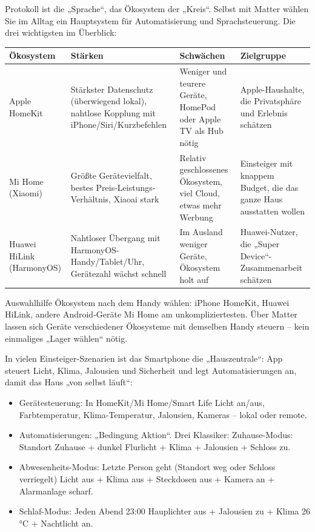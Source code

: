 
Protokoll ist die „Sprache“, das Ökosystem der „Kreis“. Selbst mit Matter wählen Sie im Alltag ein Hauptsystem für Automatisierung und Sprachsteuerung. Die drei wichtigsten im Überblick:

\begin{center}
\begin{tabularx}{\linewidth}{|X|X|X|X|}
\hline
\textbf{Ökosystem} & \textbf{Stärken} & \textbf{Schwächen} & \textbf{Zielgruppe} \tabularnewline
\hline
Apple HomeKit & Stärkster Datenschutz (überwiegend lokal), nahtlose Kopplung mit iPhone/Siri/Kurzbefehlen & Weniger und teurere Geräte, HomePod oder Apple TV als Hub nötig & Apple-Haushalte, die Privatsphäre und Erlebnis schätzen \tabularnewline
Mi Home (Xiaomi) & Größte Gerätevielfalt, bestes Preis-Leistungs-Verhältnis, Xiaoai stark & Relativ geschlossenes Ökosystem, viel Cloud, etwas mehr Werbung & Einsteiger mit knappem Budget, die das ganze Haus ausstatten wollen \tabularnewline
Huawei HiLink (HarmonyOS) & Nahtloser Übergang mit HarmonyOS-Handy/Tablet/Uhr, Gerätezahl wächst schnell & Im Ausland weniger Geräte, Ökosystem holt auf & Huawei-Nutzer, die „Super Device“-Zusammenarbeit schätzen \tabularnewline
\hline
\end{tabularx}
\end{center}

\begin{tcbinfo}{Auswahlhilfe}
Ökosystem nach dem Handy wählen: iPhone HomeKit, Huawei HiLink, andere Android-Geräte Mi Home am unkompliziertesten. Über Matter lassen sich Geräte verschiedener Ökosysteme mit demselben Handy steuern – kein einmaliges „Lager wählen“ nötig.

\end{tcbinfo}


In vielen Einsteiger-Szenarien ist das Smartphone die „Hauszentrale“: App steuert Licht, Klima, Jalousien und Sicherheit und legt Automatisierungen an, damit das Haus „von selbst läuft“:

\begin{itemize}
  \item Gerätesteuerung: In HomeKit/Mi Home/Smart Life Licht an/aus, Farbtemperatur, Klima-Temperatur, Jalousien, Kameras – lokal oder remote.
  \item Automatisierungen: „Bedingung Aktion“. Drei Klassiker: Zuhause-Modus: Standort Zuhause + dunkel Flurlicht + Klima + Jalousien + Schloss zu.
  \item Abwesenheits-Modus: Letzte Person geht (Standort weg oder Schloss verriegelt) Licht aus + Klima aus + Steckdosen aus + Kamera an + Alarmanlage scharf.
  \item Schlaf-Modus: Jeden Abend 23:00 Hauplichter aus + Jalousien zu + Klima 26 °C + Nachtlicht an.
\end{itemize}

